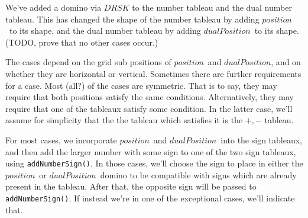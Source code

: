\documentclass[12pt]{article}
\numberwithin{equation}{section}
\newcommand{\pos}{$position$}
\newcommand{\dpos}{$dualPosition$}
\begin{document}
  We've added a domino via $DRSK$ to the number tableau and the dual number tableau.
  This has changed the shape of the number tableau by adding \pos\ to its shape, and the dual number tableau by adding \dpos\ to its shape.
  (TODO, prove that no other cases occur.)

  The cases depend on the grid sub positions of \pos\ and \dpos, and on whether they are horizontal or vertical.
  Sometimes there are further requirements for a case.
  Most (all?) of the cases are symmetric.
  That is to say, they may require that both positions satisfy the same conditions.
  Alternatively, they may require that one of the tableaux satisfy some condition.
  In the latter case, we'll assume for simplicity that the the tableau which satisfies it is the $+,-$ tableau.

  For most cases, we incorporate \pos\ and \dpos\ into the sign tableaux, and then add the larger number with some sign to one of the two sign tableaux, using \texttt{addNumberSign()}.
  In those cases, we'll choose the sign to place in either the \pos\ or \dpos\ domino to be compatible with signs which are already present in the tableau.
  After that, the opposite sign will be passed to \texttt{addNumberSign()}.
  If instead we're in one of the exceptional cases, we'll indicate that.
\end{document}
